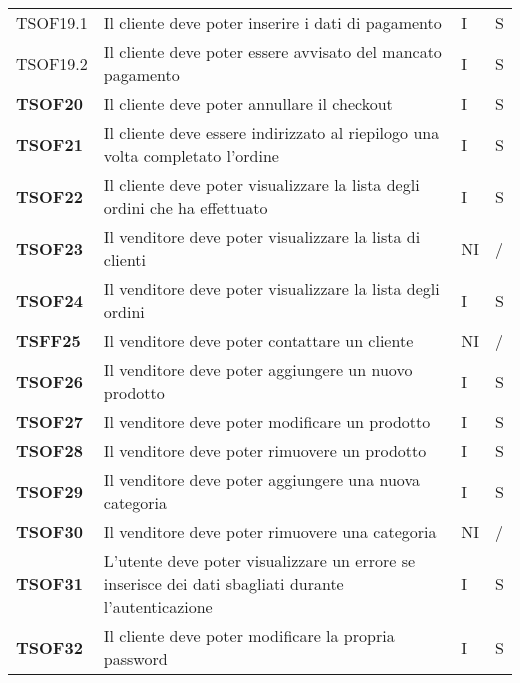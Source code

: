 \begin{center}
\begin{longtable}[!h]{p{60px} p{240px} p{35px} p{35px}}
        TSOF19.1        & Il cliente deve poter inserire i dati di pagamento                                                  & I              & S              \\
        TSOF19.2        & Il cliente deve poter essere avvisato del mancato pagamento                                         & I              & S              \\
        \textbf{TSOF20} & Il cliente deve poter annullare il checkout                                                         & I              & S              \\
        \textbf{TSOF21} & Il cliente deve essere indirizzato al riepilogo una volta completato l'ordine                       & I              & S              \\
        \textbf{TSOF22} & Il cliente deve poter visualizzare la lista degli ordini che ha effettuato                          & I              & S              \\
        \textbf{TSOF23} & Il venditore deve poter visualizzare la lista di clienti                                            & NI             & /              \\
        \textbf{TSOF24} & Il venditore deve poter visualizzare la lista degli ordini                                          & I              & S              \\
        \textbf{TSFF25} & Il venditore deve poter contattare un cliente                                                       & NI             & /              \\
        \textbf{TSOF26} & Il venditore deve poter aggiungere un nuovo prodotto                                                & I              & S              \\
        \textbf{TSOF27} & Il venditore deve poter modificare un prodotto                                                      & I              & S              \\
        \textbf{TSOF28} & Il venditore deve poter rimuovere un prodotto                                                       & I              & S              \\
        \textbf{TSOF29} & Il venditore deve poter aggiungere una nuova categoria                                              & I              & S              \\
        \textbf{TSOF30} & Il venditore deve poter rimuovere una categoria                                                     & NI             & /              \\
        \textbf{TSOF31} & L'utente deve poter visualizzare un errore se inserisce dei dati sbagliati durante l'autenticazione & I              & S              \\
        \textbf{TSOF32} & Il cliente deve poter modificare la propria password                                                & I              & S              \\
    \end{longtable}
\end{center}
\pagebreak
